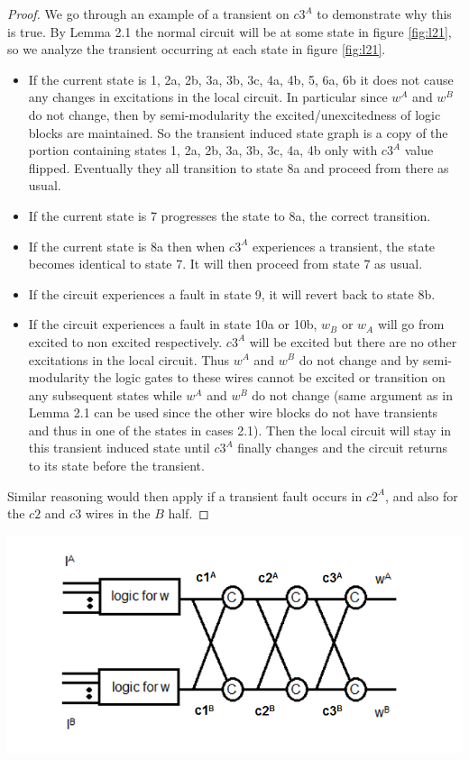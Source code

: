 \documentclass[12pt]{report}
\begin{document}
\begin{proof}
We go through an example of a transient on $c3^A$ to demonstrate why this is true.  By Lemma 2.1 the normal circuit will be at some state in figure \ref{fig:l21}, so we analyze the transient occurring at each state in figure \ref{fig:l21}.
\begin{itemize}
	\item
If the current state is 1, 2a, 2b, 3a, 3b, 3c, 4a, 4b, 5, 6a, 6b it does not cause any changes in excitations in the local circuit.  In particular since $w^A$ and $w^B$ do not change, then by semi-modularity the excited/unexcitedness of logic blocks are maintained.  So the transient induced state graph is a copy of the portion containing states 1, 2a, 2b, 3a, 3b, 3c, 4a, 4b only with $c3^A$ value flipped. Eventually they all transition to state 8a and proceed from there as usual.
	\item
If the current state is 7 progresses the state to 8a, the correct transition.	
	\item
      If the current state is 8a then when $c3^A$ experiences a transient, the state
 becomes identical to state 7.  It will then proceed from state 7 as usual.   
	\item
If the circuit experiences a fault in state 9, it will revert back to state 8b.  
	\item
If the circuit experiences a fault in state 10a or 10b, $w_B$ or $w_A$ will go from excited to non excited respectively.  $c3^A$ will be excited but there are no other excitations in the local circuit.  Thus $w^A$ and $w^B$ do not change and by semi-modularity the logic gates to these wires cannot be excited or transition on any subsequent states while $w^A$ and $w^B$ do not change (same argument as in Lemma 2.1 can be used since the other wire blocks do not have transients and thus in one of the states in cases 2.1).  Then the local circuit will stay in this transient induced state until $c3^A$ finally changes and the circuit returns to its state before the transient.
\end{itemize}
Similar reasoning would then apply if a transient fault occurs in $c2^A$, and also for the $c2$ and $c3$ wires in the $B$ half.  
\end{proof}

\includegraphics[width=.8\textwidth]{gatew}
\end{document}
